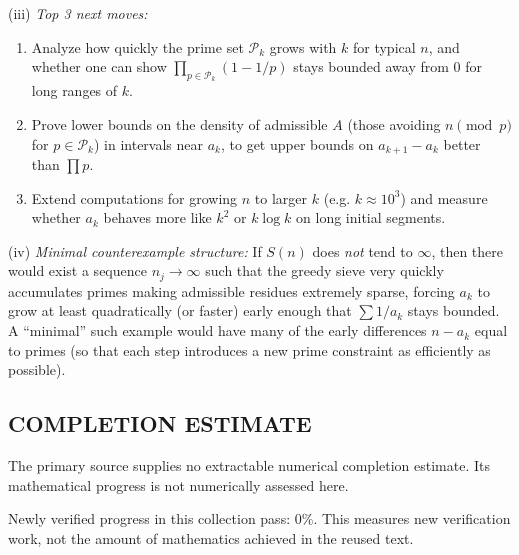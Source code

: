(iii) \emph{Top 3 next moves:}
\begin{enumerate}
\item Analyze how quickly the prime set $\mathcal P_k$ grows with $k$ for typical $n$, and whether one can show $\prod_{p\in\mathcal P_k}(1-1/p)$ stays bounded away from $0$ for long ranges of $k$.
\item Prove lower bounds on the density of admissible $A$ (those avoiding $n\pmod p$ for $p\in\mathcal P_k$) in intervals near $a_k$, to get upper bounds on $a_{k+1}-a_k$ better than $\prod p$.
\item Extend computations for growing $n$ to larger $k$ (e.g. $k\approx 10^3$) and measure whether $a_k$ behaves more like $k^2$ or $k\log k$ on long initial segments.
\end{enumerate}

(iv) \emph{Minimal counterexample structure:} If $S(n)$ does \emph{not} tend to $\infty$, then there would exist a sequence $n_j\to\infty$ such that the greedy sieve very quickly accumulates primes making admissible residues extremely sparse, forcing $a_k$ to grow at least quadratically (or faster) early enough that $\sum 1/a_k$ stays bounded. A ``minimal'' such example would have many of the early differences $n-a_k$ equal to primes (so that each step introduces a new prime constraint as efficiently as possible).




\subsection*{COMPLETION ESTIMATE}
The primary source supplies no extractable numerical completion estimate. Its mathematical progress is not numerically assessed here.

Newly verified progress in this collection pass: $0\%$. This measures new verification work, not the amount of mathematics achieved in the reused text.
